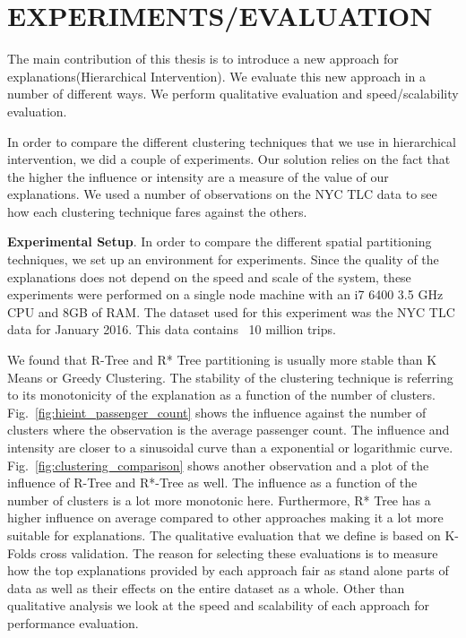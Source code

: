 \chapter{EXPERIMENTS/EVALUATION}
\label{chp:eval}
\label{sec:evaluation}
The main contribution of this thesis is to introduce a new approach for explanations(Hierarchical Intervention). We evaluate this new approach in a number of different ways. We perform qualitative evaluation and speed/scalability evaluation.

In order to compare the different clustering techniques that we use in hierarchical intervention, we did a couple of experiments. Our solution relies on the fact that the higher the influence or intensity are a measure of the value of our explanations. We used a number of observations on the NYC TLC data to see how each clustering technique fares against the others.

\textbf{Experimental Setup}. In order to compare the different spatial partitioning techniques, we set up an environment for experiments. Since the quality of the explanations does not depend on the speed and scale of the system, these experiments were performed on a single node machine with an i7 6400 3.5 GHz CPU and 8GB of RAM. The dataset used for this experiment was the NYC TLC data for January 2016. This data contains ~10 million trips.

We found that R-Tree and R* Tree partitioning is usually more stable than K Means or Greedy Clustering. The stability of the clustering technique is referring to its monotonicity of the explanation as a function of the number of clusters. Fig.~\ref{fig:hieint_passenger_count} shows the influence against the number of clusters where the observation is the average passenger count. The influence and intensity are closer to a sinusoidal curve than a exponential or logarithmic curve. Fig.~\ref{fig:clustering_comparison} shows another observation and a plot of the influence of R-Tree and R*-Tree as well. The influence as a function of the number of clusters is a lot more monotonic here. Furthermore, R* Tree has a higher influence on average compared to other approaches making it a lot more suitable for explanations.
The qualitative evaluation that we define is based on K-Folds cross validation. The reason for selecting these evaluations is to measure how the top explanations provided by each approach fair as stand alone parts of data as well as their effects on the entire dataset as a whole. Other than qualitative analysis we look at the speed and scalability of each approach for performance evaluation.

